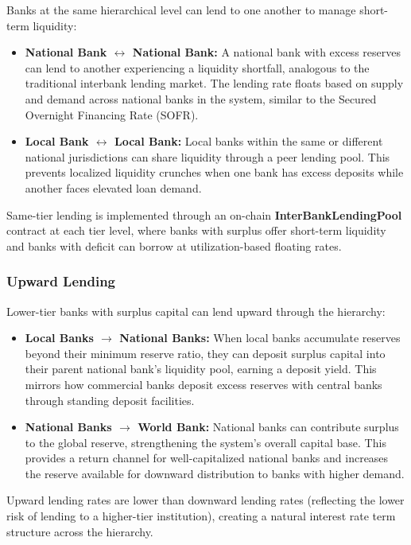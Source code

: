 \documentclass[12pt,a4paper]{report}
\begin{document}
Banks at the same hierarchical level can lend to one another to manage short-term liquidity:

\begin{itemize}[noitemsep]
\item \textbf{National Bank $\leftrightarrow$ National Bank:} A national bank with excess reserves can lend to another experiencing a liquidity shortfall, analogous to the traditional interbank lending market. The lending rate floats based on supply and demand across national banks in the system, similar to the Secured Overnight Financing Rate (SOFR).
\item \textbf{Local Bank $\leftrightarrow$ Local Bank:} Local banks within the same or different national jurisdictions can share liquidity through a peer lending pool. This prevents localized liquidity crunches when one bank has excess deposits while another faces elevated loan demand.
\end{itemize}

Same-tier lending is implemented through an on-chain \textbf{InterBankLendingPool} contract at each tier level, where banks with surplus offer short-term liquidity and banks with deficit can borrow at utilization-based floating rates.

\subsubsection{Upward Lending}

Lower-tier banks with surplus capital can lend upward through the hierarchy:

\begin{itemize}[noitemsep]
\item \textbf{Local Banks $\to$ National Banks:} When local banks accumulate reserves beyond their minimum reserve ratio, they can deposit surplus capital into their parent national bank's liquidity pool, earning a deposit yield. This mirrors how commercial banks deposit excess reserves with central banks through standing deposit facilities.
\item \textbf{National Banks $\to$ World Bank:} National banks can contribute surplus to the global reserve, strengthening the system's overall capital base. This provides a return channel for well-capitalized national banks and increases the reserve available for downward distribution to banks with higher demand.
\end{itemize}

Upward lending rates are lower than downward lending rates (reflecting the lower risk of lending to a higher-tier institution), creating a natural interest rate term structure across the hierarchy.
\end{document}
